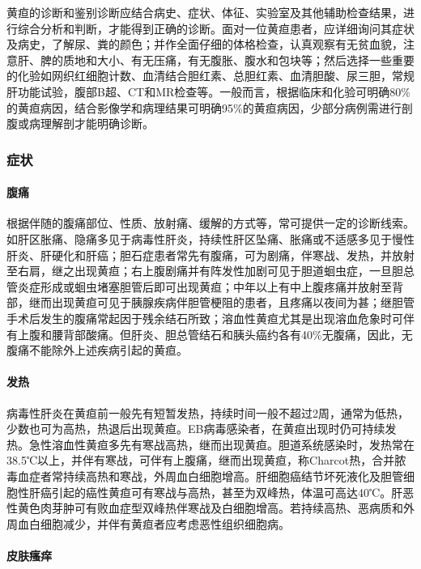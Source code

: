 黄疸的诊断和鉴别诊断应结合病史、症状、体征、实验室及其他辅助检查结果，进行综合分析和判断，才能得到正确的诊断。面对一位黄疸患者，应详细询问其症状及病史，了解尿、粪的颜色；并作全面仔细的体格检查，认真观察有无贫血貌，注意肝、脾的质地和大小、有无压痛，有无腹胀、腹水和包块等；然后选择一些重要的化验如网织红细胞计数、血清结合胆红素、总胆红素、血清胆酸、尿三胆，常规肝功能试验，腹部B超、CT和MR检查等。一般而言，根据临床和化验可明确80\%的黄疸病因，结合影像学和病理结果可明确95\%的黄疸病因，少部分病例需进行剖腹或病理解剖才能明确诊断。

\subsubsection{症状}

\paragraph{腹痛}

根据伴随的腹痛部位、性质、放射痛、缓解的方式等，常可提供一定的诊断线索。如肝区胀痛、隐痛多见于病毒性肝炎，持续性肝区坠痛、胀痛或不适感多见于慢性肝炎、肝硬化和肝癌；胆石症患者常先有腹痛，可为剧痛，伴寒战、发热，并放射至右肩，继之出现黄疸；右上腹剧痛并有阵发性加剧可见于胆道蛔虫症，一旦胆总管炎症形成或蛔虫堵塞胆管后即可出现黄疸；中年以上有中上腹疼痛并放射至背部，继而出现黄疸可见于胰腺疾病伴胆管梗阻的患者，且疼痛以夜间为甚；继胆管手术后发生的腹痛常起因于残余结石所致；溶血性黄疸尤其是出现溶血危象时可伴有上腹和腰背部酸痛。但肝炎、胆总管结石和胰头癌约各有40\%无腹痛，因此，无腹痛不能除外上述疾病引起的黄疸。

\paragraph{发热}

病毒性肝炎在黄疸前一般先有短暂发热，持续时间一般不超过2周，通常为低热，少数也可为高热，热退后出现黄疸。EB病毒感染者，在黄疸出现时仍可持续发热。急性溶血性黄疸多先有寒战高热，继而出现黄疸。胆道系统感染时，发热常在38.5℃以上，并伴有寒战，可伴有上腹痛，继而出现黄疸，称Charcot热，合并脓毒血症者常持续高热和寒战，外周血白细胞增高。肝细胞癌结节坏死液化及胆管细胞性肝癌引起的癌性黄疸可有寒战与高热，甚至为双峰热，体温可高达40℃。肝恶性黄色肉芽肿可有败血症型双峰热伴寒战及白细胞增高。若持续高热、恶病质和外周血白细胞减少，并伴有黄疸者应考虑恶性组织细胞病。

\paragraph{皮肤瘙痒}

